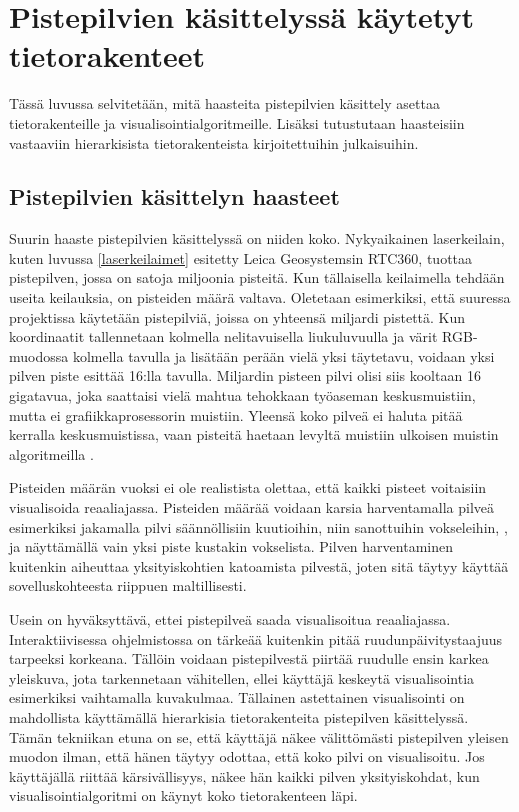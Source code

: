 \section{Pistepilvien käsittelyssä käytetyt tietorakenteet}

Tässä luvussa selvitetään, mitä haasteita pistepilvien käsittely asettaa tietorakenteille ja visualisointialgoritmeille. Lisäksi tutustutaan haasteisiin vastaaviin hierarkisista tietorakenteista kirjoitettuihin julkaisuihin.

\subsection{Pistepilvien käsittelyn haasteet}

Suurin haaste pistepilvien käsittelyssä on niiden koko. Nykyaikainen laserkeilain, kuten luvussa \ref{laserkeilaimet} esitetty Leica Geosystemsin RTC360, tuottaa pistepilven, jossa on satoja miljoonia pisteitä. Kun tällaisella keilaimella tehdään useita keilauksia, on pisteiden määrä valtava. Oletetaan esimerkiksi, että suuressa projektissa käytetään pistepilviä, joissa on yhteensä miljardi pistettä. Kun koordinaatit tallennetaan kolmella nelitavuisella liukuluvuulla ja värit RGB-muodossa kolmella tavulla ja lisätään perään vielä yksi täytetavu, voidaan yksi pilven piste esittää 16:lla tavulla. Miljardin pisteen pilvi olisi siis kooltaan 16 gigatavua, joka saattaisi vielä mahtua tehokkaan työaseman keskusmuistiin, mutta ei grafiikkaprosessorin muistiin. Yleensä koko pilveä ei haluta pitää kerralla keskusmuistissa, vaan pisteitä haetaan levyltä muistiin ulkoisen muistin algoritmeilla .

Pisteiden määrän vuoksi ei ole realistista olettaa, että kaikki pisteet voitaisiin visualisoida reaaliajassa. Pisteiden määrää voidaan karsia harventamalla pilveä esimerkiksi jakamalla pilvi säännöllisiin kuutioihin, niin sanottuihin vokseleihin, , ja näyttämällä vain yksi piste kustakin vokselista. %
Pilven harventaminen kuitenkin aiheuttaa yksityiskohtien katoamista pilvestä, joten sitä täytyy käyttää sovelluskohteesta riippuen maltillisesti. 

Usein on hyväksyttävä, ettei pistepilveä saada visualisoitua reaaliajassa. Interaktiivisessa ohjelmistossa on tärkeää kuitenkin pitää ruudunpäivitystaajuus tarpeeksi korkeana. Tällöin voidaan pistepilvestä piirtää ruudulle ensin karkea yleiskuva, jota tarkennetaan vähitellen, ellei käyttäjä keskeytä visualisointia esimerkiksi vaihtamalla kuvakulmaa. Tällainen astettainen visualisointi on mahdollista käyttämällä hierarkisia tietorakenteita pistepilven käsittelyssä. Tämän tekniikan etuna on se, että käyttäjä näkee välittömästi pistepilven yleisen muodon ilman, että hänen täytyy odottaa, että koko pilvi on visualisoitu. Jos käyttäjällä riittää kärsivällisyys, näkee hän kaikki pilven yksityiskohdat, kun visualisointialgoritmi on käynyt koko tietorakenteen läpi. 


